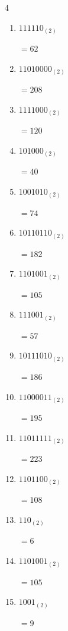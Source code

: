 \newpage
\resetdrill

\begin{multicols}{4}
\begin{enumerate}
  \itemsep=10pt
  \item $111110_{(2)}$

        $=62$

  \item $11010000_{(2)}$

        $=208$

  \item $1111000_{(2)}$

        $=120$

  \item $101000_{(2)}$

        $=40$

  \item $1001010_{(2)}$

        $=74$

  \item $10110110_{(2)}$

        $=182$

  \item $1101001_{(2)}$

        $=105$

  \item $111001_{(2)}$

        $=57$

  \item $10111010_{(2)}$

        $=186$

  \item $11000011_{(2)}$

        $=195$

  \item $11011111_{(2)}$

        $=223$

  \item $1101100_{(2)}$

        $=108$

  \item $110_{(2)}$

        $=6$

  \item $1101001_{(2)}$

        $=105$

  \item $1001_{(2)}$

        $=9$

\columnbreak %


\end{enumerate}
\end{multicols}
